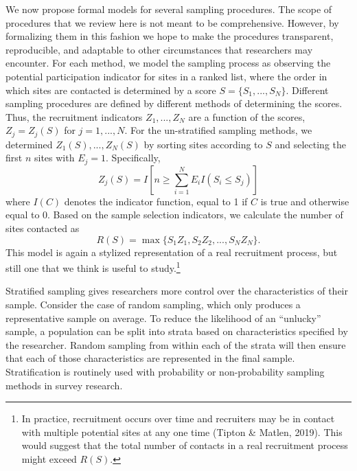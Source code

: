 \documentclass[
  man,floatsintext]{apa6}
\begin{document}
We now propose formal models for several sampling procedures. The scope of procedures that we review here is not meant to be comprehensive. However, by formalizing them in this fashion we hope to make the procedures transparent, reproducible, and adaptable to other circumstances that researchers may encounter.
For each method, we model the sampling process as observing the potential participation indicator for sites in a ranked list, where the order in which sites are contacted is determined by a score \(S = \{S_1,...,S_N\}\). Different sampling procedures are defined by different methods of determining the scores. Thus, the recruitment indicators \(Z_1,...,Z_N\) are a function of the scores, \(Z_j = Z_j(S)\) for \(j = 1,...,N\).
For the un-stratified sampling methods, we determined \(Z_1(S),...,Z_N(S)\) by sorting sites according to \(S\) and selecting the first \(n\) sites with \(E_j = 1\).
Specifically,
\begin{equation}
\label{eq:Zj}
Z_j(S) = I\left[n \geq \sum_{i=1}^N E_i I\left(S_i \leq S_j\right)\right]
\end{equation}
where \(I(C)\) denotes the indicator function, equal to 1 if \(C\) is true and otherwise equal to 0. Based on the sample selection indicators, we calculate the number of sites contacted as
\begin{equation}
\label{eq:R}
R(S) =  \max \{S_1 Z_1, S_2 Z_2, ..., S_N Z_N\}.
\end{equation}
This model is again a stylized representation of a real recruitment process, but still one that we think is useful to study.\footnote{In practice, recruitment occurs over time and recruiters may be in contact with multiple potential sites at any one time (Tipton \& Matlen, 2019). This would suggest that the total number of contacts in a real recruitment process might exceed \(R(S)\).}

Stratified sampling gives researchers more control over the characteristics of their sample. Consider the case of random sampling, which only produces a representative sample on average. To reduce the likelihood of an ``unlucky'' sample, a population can be split into strata based on characteristics specified by the researcher. Random sampling from within each of the strata will then ensure that each of those characteristics are represented in the final sample. Stratification is routinely used with probability or non-probability sampling methods in survey research.
\end{document}
